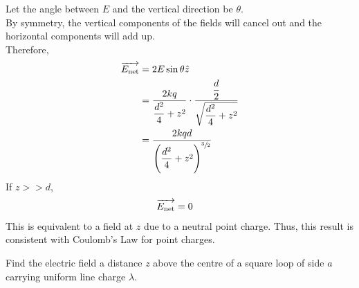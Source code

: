 \documentclass[fleqn, a4paper, 12pt, oneside]{amsart}
\theoremstyle{definition}
\theoremstyle{theorem}
\begin{document}
\begin{solution}
\begin{tasks}
\begin{figure}[H]
			\end{figure}
			Let the angle between $E$ and the vertical direction be $\theta$.\\
			By symmetry, the vertical components of the fields will cancel out and the horizontal components will add up.\\
			Therefore,
			\begin{align*}
				\overrightarrow{E_{\textnormal{net}}} &= 2 E \sin \theta \hat{z}\\
				&= \dfrac{2 k q}{\dfrac{d^2}{4} + z^2} \cdot \dfrac{\dfrac{d}{2}}{\sqrt{\dfrac{d^2}{4} + z^2}}\\
				&= \dfrac{2 k q d}{\left( \dfrac{d^2}{4} + z^2 \right)^{\sfrac{3}{2}}}
			\end{align*}
			If $z >> d$,
			\begin{align*}
				\overrightarrow{E_{\textnormal{net}}} &= 0
			\end{align*}
			This is equivalent to a field at $z$ due to a neutral point charge. Thus, this result is consistent with Coulomb's Law for point charges.
	\end{tasks}
\end{solution}

\begin{question}
		Find the electric field a distance $z$ above the centre of a square loop of side $a$ carrying uniform line charge $\lambda$.
\end{question}
\end{document}
